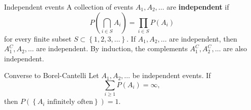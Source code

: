                 \begin{defn}{Independent events}{}
                    A collection of events \( A_1, A_2, \dots  \) are \textbf{independent} if 
                    \[
                        P \left( \bigcap_{ i \in S} A_{i}  \right)  = \prod_{i \in  S} P(A_{i} ) 
                    \]
                    for every finite subset \( S \subset \left\{ 1, 2, 3, \dots  \right\}  \). If \( A_1, A_2, \dots  \) are independent, then \( A_1 ^{C} , A_2, \dots  \)  are independent. By induction, the complements \( A_1 ^{C} , A_2 ^{C} ,\dots  \) are also independent. 
                    \end{defn}
                    \begin{lem}{Converse to Borel-Cantelli}{}
                        Let \( A_1, A_2, \dots  \) be independent events. If 
                        \[
                            \sum _{i\geq 1} P(A_{i} )= \infty , 
                        \]
                        then \( P (\left\{ A_{i} \text{ infinitely often}  \right\} ) = 1.\) 
                        
                        
                        \end{lem}
                        

